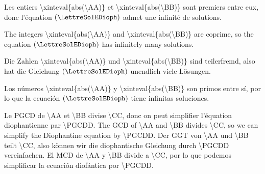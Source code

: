 {    \par\smallskip

        {%
                {%
                    \if@pfllngfr
                        Les entiers \num{\xinteval{abs(\AA)}} et \num{\xinteval{abs(\BB)}} sont premiers entre eux, donc l'équation $(\LettreSolEDioph)$ admet une infinité de solutions.\par
                        \xdef\AAA{\AA}\xdef\BBB{\BB}\xdef\CCC{\CC}%
                    \fi
                    \if@pfllngen
                        The integers \num{\xinteval{abs(\AA)}} and \num{\xinteval{abs(\BB)}} are coprime, so the equation $(\LettreSolEDioph)$ has infinitely many solutions.\par
                        \xdef\AAA{\AA}\xdef\BBB{\BB}\xdef\CCC{\CC}%
                    \fi
                    \if@pfllngde
                        Die Zahlen \num{\xinteval{abs(\AA)}} und \num{\xinteval{abs(\BB)}} sind teilerfremd, also hat die Gleichung $(\LettreSolEDioph)$ unendlich viele Lösungen.\par
                        \xdef\AAA{\AA}\xdef\BBB{\BB}\xdef\CCC{\CC}%
                    \fi
                    \if@pfllnges
                        Los números \num{\xinteval{abs(\AA)}} y \num{\xinteval{abs(\BB)}} son primos entre sí, por lo que la ecuación $(\LettreSolEDioph)$ tiene infinitas soluciones.\par
                        \xdef\AAA{\AA}\xdef\BBB{\BB}\xdef\CCC{\CC}%
                    \fi
                }%
                {%
                    \if@pfllngfr
                        Le PGCD de \num{\AA} et \num{\BB} divise \num{\CC}, donc on peut simplifier l'équation diophantienne par \num{\PGCDD}.
                    \fi
                    \if@pfllngen
                        The GCD of \num{\AA} and \num{\BB} divides \num{\CC}, so we can simplify the Diophantine equation by \num{\PGCDD}.
                    \fi
                    \if@pfllngde
                        Der GGT von \num{\AA} und \num{\BB} teilt \num{\CC}, also können wir die diophantische Gleichung durch \num{\PGCDD} vereinfachen.
                    \fi
                    \if@pfllnges
                        El MCD de \num{\AA} y \num{\BB} divide a \num{\CC}, por lo que podemos simplificar la ecuación diofántica por \num{\PGCDD}.
                    \fi
                    \xdef\AAA{\xintiieval{\AA/\PGCDD}}\xdef\BBB{\xintiieval{\BB/\PGCDD}}\xdef\CCC{\xintiieval{\CC/\PGCDD}}%
}}}
